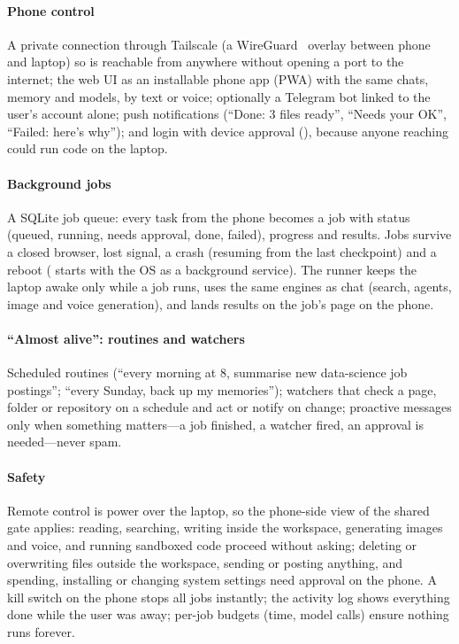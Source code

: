 \paragraph{Phone control} A private connection through Tailscale (a WireGuard~\cite{wireguard} overlay between phone and laptop) so \hivi{} is reachable from anywhere without opening a port to the internet; the web UI as an installable phone app (PWA) with the same chats, memory and models, by text or voice; optionally a Telegram bot linked to the user's account alone; push notifications (``Done: 3 files ready'', ``Needs your OK'', ``Failed: here's why''); and login with device approval (), because anyone reaching \hivi{} could run code on the laptop.

\paragraph{Background jobs} A SQLite job queue: every task from the phone becomes a job with status (queued, running, needs approval, done, failed), progress and results. Jobs survive a closed browser, lost signal, a crash (resuming from the last checkpoint) and a reboot (\hivi{} starts with the OS as a background service). The runner keeps the laptop awake only while a job runs, uses the same engines as chat (search, agents, image and voice generation), and lands results on the job's page on the phone.

\paragraph{``Almost alive'': routines and watchers} Scheduled routines (``every morning at 8, summarise new data-science job postings''; ``every Sunday, back up my memories''); watchers that check a page, folder or repository on a schedule and act or notify on change; proactive messages only when something matters---a job finished, a watcher fired, an approval is needed---never spam.

\paragraph{Safety} Remote control is power over the laptop, so the phone-side view of the shared gate applies: reading, searching, writing inside the workspace, generating images and voice, and running sandboxed code proceed without asking; deleting or overwriting files outside the workspace, sending or posting anything, and spending, installing or changing system settings need approval on the phone. A kill switch on the phone stops all jobs instantly; the activity log shows everything done while the user was away; per-job budgets (time, model calls) ensure nothing runs forever.

